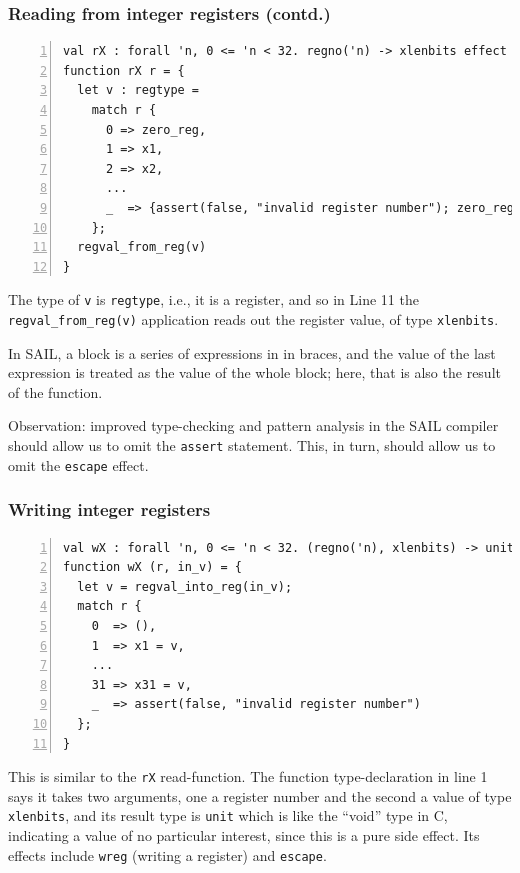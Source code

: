 \documentclass[aspectratio=169]{beamer}
\newcommand{\slidefont}{\scriptsize}
\newcommand{\cf}{\scriptsize\tt}
\begin{document}

\begin{frame}[fragile]
  \frametitle{Reading from integer registers (contd.)}

  \slidefont

  \begin{Verbatim}[frame=single, numbers=left, label = File riscv\_regs.sail]
val rX : forall 'n, 0 <= 'n < 32. regno('n) -> xlenbits effect {rreg, escape}
function rX r = {
  let v : regtype =
    match r {
      0 => zero_reg,
      1 => x1,
      2 => x2,
      ...
      _  => {assert(false, "invalid register number"); zero_reg}
    };
  regval_from_reg(v)
}
  \end{Verbatim}

  \begin{minipage}{\textwidth}
    The type of {\cf v} is {\cf regtype}, i.e., it is a register, and
    so in Line 11 the {\cf regval\_from\_reg(v)} application reads out
    the register value, of type {\cf xlenbits}.

    \vspace{1ex}

    In SAIL, a block is a series of expressions in in braces, and the
    value of the last expression is treated as the value of the whole
    block; here, that is also the result of the function.

    \vspace{1ex}

    Observation: improved type-checking and pattern analysis in the
    SAIL compiler should allow us to omit the {\cf assert} statement.
    This, in turn, should allow us to omit the {\cf escape} effect.
  \end{minipage}

\end{frame}


\begin{frame}[fragile]
  \frametitle{Writing integer registers}

  \slidefont

  \begin{Verbatim}[frame=single, numbers=left, label = File riscv\_regs.sail]
val wX : forall 'n, 0 <= 'n < 32. (regno('n), xlenbits) -> unit effect {wreg, escape}
function wX (r, in_v) = {
  let v = regval_into_reg(in_v);
  match r {
    0  => (),
    1  => x1 = v,
    ...
    31 => x31 = v,
    _  => assert(false, "invalid register number")
  };
}
  \end{Verbatim}

  \begin{minipage}{\textwidth}
    This is similar to the {\cf rX} read-function.  The function
    type-declaration in line 1 says it takes two arguments, one a
    register number and the second a value of type {\cf xlenbits}, and
    its result type is {\cf unit} which is like the ``void'' type in
    C, indicating a value of no particular interest, since this is a
    pure side effect.  Its effects include {\cf wreg} (writing a
    register) and {\cf escape}.
  \end{minipage}

\end{frame}
\end{document}
